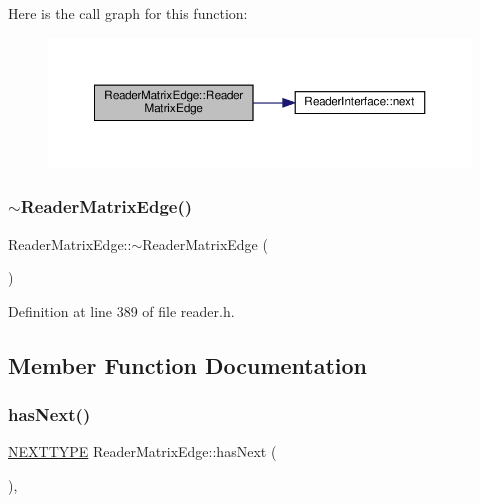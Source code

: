 Here is the call graph for this function\+:\nopagebreak
\begin{figure}[H]
\begin{center}
\leavevmode
\includegraphics[width=350pt]{classReaderMatrixEdge_a8bb3d1f9b91410abcfc2bc1c3becea5c_cgraph}
\end{center}
\end{figure}
\mbox{\label{classReaderMatrixEdge_ae6a8f85585a25e38164c2bf8ec18c9b8}} 
\subsubsection{\texorpdfstring{$\sim$\+Reader\+Matrix\+Edge()}{~ReaderMatrixEdge()}}
{\footnotesize\ttfamily Reader\+Matrix\+Edge\+::$\sim$\+Reader\+Matrix\+Edge (\begin{DoxyParamCaption}{ }\end{DoxyParamCaption})\hspace{0.3cm}{\ttfamily [inline]}}



Definition at line 389 of file reader.\+h.



\subsection{Member Function Documentation}
\mbox{\label{classReaderMatrixEdge_a61598aded2eab7ef2024636a5381423b}} 
\subsubsection{\texorpdfstring{has\+Next()}{hasNext()}}
{\footnotesize\ttfamily \hyperlink{classReaderInterface_ac2420ec8d2f60feadf2533d4fa77ec5e}{N\+E\+X\+T\+T\+Y\+PE} Reader\+Matrix\+Edge\+::has\+Next (\begin{DoxyParamCaption}{ }\end{DoxyParamCaption})\hspace{0.3cm}{\ttfamily [inline]}, {\ttfamily [virtual]}}

